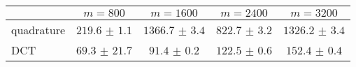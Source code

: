 \centering
\renewcommand{\arraystretch}{1.2}
\begin{tabular}{@{}lcccc@{}}
\toprule
 & $m=800$ & $m=1600$ & $m=2400$ & $m=3200$\\
\midrule
quadrature & $219.6$ $\pm$ $1.1$ & $1366.7$ $\pm$ $3.4$ & $822.7$ $\pm$ $3.2$ & $1326.2$ $\pm$ $3.4$ \\
DCT & $69.3$ $\pm$ $21.7$ & $91.4$ $\pm$ $0.2$ & $122.5$ $\pm$ $0.6$ & $152.4$ $\pm$ $0.4$ \\
\bottomrule
\end{tabular}
